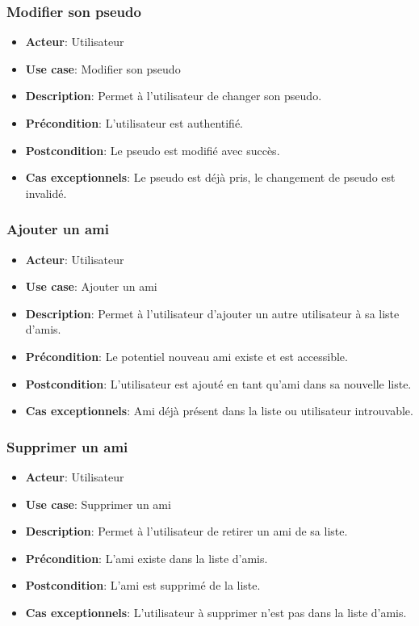 \documentclass{article}
\begin{document}
\subsubsection*{Modifier son pseudo}
\begin{itemize}
    \item \textbf{Acteur}: Utilisateur
    \item \textbf{Use case}: Modifier son pseudo
    \item \textbf{Description}: Permet à l'utilisateur de changer son pseudo.
    \item \textbf{Précondition}: L'utilisateur est authentifié.
    \item \textbf{Postcondition}: Le pseudo est modifié avec succès.
    \item \textbf{Cas exceptionnels}: Le pseudo est déjà pris, le changement de pseudo est invalidé.
\end{itemize}

\subsubsection*{Ajouter un ami}
\begin{itemize}
    \item \textbf{Acteur}: Utilisateur
    \item \textbf{Use case}: Ajouter un ami
    \item \textbf{Description}: Permet à l'utilisateur d'ajouter un autre utilisateur à sa liste d'amis.
    \item \textbf{Précondition}: Le potentiel nouveau ami existe et est accessible.
    \item \textbf{Postcondition}: L'utilisateur est ajouté en tant qu'ami dans sa nouvelle liste.
    \item \textbf{Cas exceptionnels}: Ami déjà présent dans la liste ou utilisateur introuvable.
\end{itemize}

\subsubsection*{Supprimer un ami}
\begin{itemize}
    \item \textbf{Acteur}: Utilisateur
    \item \textbf{Use case}: Supprimer un ami
    \item \textbf{Description}: Permet à l'utilisateur de retirer un ami de sa liste.
    \item \textbf{Précondition}: L'ami existe dans la liste d'amis.
    \item \textbf{Postcondition}: L'ami est supprimé de la liste.
    \item \textbf{Cas exceptionnels}: L'utilisateur à supprimer n'est pas dans la liste d'amis.
\end{itemize}
\end{document}
